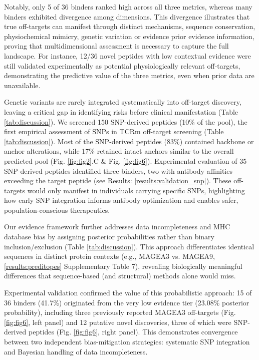 \documentclass[times, twoside, watermark]{zHenriquesLab-StyleBioRxiv}
\begin{document}
    Notably, only 5 of 36 binders ranked high across all three metrics, whereas many binders exhibited divergence among dimensions. This divergence illustrates that true off-targets can manifest through distinct mechanisms, sequence conservation, physiochemical mimicry, genetic variation or evidence prior evidence information, proving that multidimensional assessment is necessary to capture the full landscape. For instance, 12/36 novel peptides with low contextual evidence were still validated experimentally as potential physiologically relevant off-targets, demonstrating the predictive value of the three metrics, even when prior data are unavailable.
    
    Genetic variants are rarely integrated systematically into off-target discovery, leaving a critical gap in identifying risks before clinical manifestation (Table \ref{tab:discussion}). We screened 150 SNP-derived peptides (10\% of the pool), the first empirical assessment of SNPs in TCRm off-target screening (Table  \ref{tab:discussion}). Most of the SNP-derived peptides (83\%) contained backbone or anchor alterations, while 17\% retained intact anchors similar to the overall predicted pool (Fig. \ref{fig:fig2}.C \& Fig. \ref{fig:fig6}). Experimental evaluation of 35 SNP-derived peptides identified three binders, two with antibody affinities exceeding the target peptide (see Results: \ref{results:validation_snp}). These off-targets would only manifest in individuals carrying specific SNPs, highlighting how early SNP integration informs antibody optimization and enables safer, population-conscious therapeutics.
    
    Our evidence framework further addresses data incompleteness and MHC database bias by assigning posterior probabilities rather than binary inclusion/exclusion (Table  \ref{tab:discussion}). This approach differentiates identical sequences in distinct protein contexts (e.g., MAGEA3 vs. MAGEA9, \ref{results:preditopes} Supplementary Table 7), revealing biologically meaningful differences that sequence-based (and structural) methods alone would miss. 
    
    Experimental validation confirmed the value of this probabilistic approach: 15 of 36 binders (41.7\%) originated from the very low evidence tier (23.08\% posterior probability), including three previously reported MAGEA3 off-targets (Fig. \ref{fig:fig6}, left panel) and 12 putative novel discoveries, three of which were SNP-derived peptides (Fig. \ref{fig:fig6}, right panel). This demonstrates convergence between two independent bias-mitigation strategies: systematic SNP integration and Bayesian handling of data incompleteness. 
    
\end{document}
